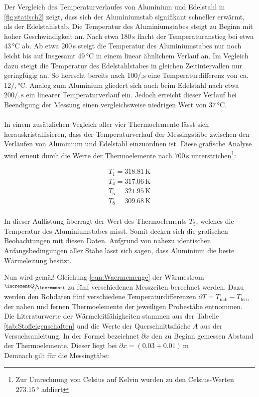 Der Vergleich des Temperaturverlaufes von Aluminium und Edelstahl in \ref{fig:statisch2} zeigt, dass 
sich der Aluminiumstab signifikant schneller erwärmt, als der Edelstahlstab.
Die Temperatur des Aluminiumstabes steigt zu Beginn mit hoher Geschwindigkeit an. Nach etwa 180\,\unit{\second} 
flacht der Temperaturanstieg bei etwa 43\,\unit{\celsius} ab. Ab etwa 200\,\unit{\second} steigt die Temperatur des Aluminiumstabes 
nur noch leicht bis auf Insgesamt 49\,\unit{\celsius} in einem linear ähnlichem Verlauf an. Im Vegleich dazu steigt die Temperatur 
des Edelstahlstabes in gleichen Zeitintervallen nur geringfügig an. So herrscht bereits nach 100/,$\unit{\second}$ eine
Temperaturdifferenz von ca. $12/,\unit{\celsius}$. Analog zum Aluminium gliedert sich auch beim Edelstahl nach etwa $200/,\unit{\second}$
ein linearer Temperaturverlauf ein. Jedoch erreicht dieser Verlauf bei Beendigung der Messung einen vergleichsweise niedrigen
Wert von $37\,\unit{\celsius}$. \\\\
In einem zusätzlichen Vegleich aller vier Thermoelemente lässt sich herauskristallisieren, dass der Temperaturverlauf der Messingstäbe
zwischen den Verläufen von Aluminium und Edelstahl einzuordnen ist. Diese grafische Analyse wird erneut durch die Werte der Thermoelemente
nach $700\,\unit{\second}$ unterstrichen\footnote{Zur Umrechnung von Celsius auf Kelvin wurden zu den Celsius-Werten $273.15\,\unit{\degree}$ addiert}:

\begin{gather*}
  T_1 = 318.81\,\unit{\kelvin}\\ 
  T_4 = 317.06\,\unit{\kelvin}\\
  T_5 = 321.95\,\unit{\kelvin}\\
  T_8 = 309.68\,\unit{\kelvin}\\
\end{gather*}

In dieser Auflistung überragt der Wert des Thermoelements $T_5$, welches die Temperatur des Aluminiumstabes misst. Somit decken sich die grafischen
Beobachtungen mit diesen Daten. Aufgrund von nahezu identischen Anfangsbedingungen aller Stäbe lässt sich sagen, dass Aluminium die beste 
Wärmeleitung besitzt.

Nun wird gemäß Gleichung \eqref{eqn:Waermemenge} der Wärmestrom $\sfrac{\increment Q}{\increment t}$ zu fünf verschiedenen Messzeiten berechnet
werden. Dazu werden den Rohdaten fünf verschiedene Temperaturdifferenzen $\partial T = T_\text{nah} - T_\text{fern}$ der nahen und fernen Thermoelemente der jeweiligen Probestäbe entnommen.
Die Literaturwerte der Wärmeleitfähigkeiten stammen aus der Tabelle \ref{tab:Stoffeigenschaften} und die Werte der Querschnittsfläche $A$ aus der
Versuchsanleitung\cite{Versuchsanleitung_v204}. In der Formel bezeichnet $\partial x$ den zu Beginn gemessen Abstand der Thermoelemente. 
Dieser liegt bei $\partial x = \left(0.03 + 0.01\right)\,\unit{\meter}$ \\
Demnach gilt für die Messingtäbe:

